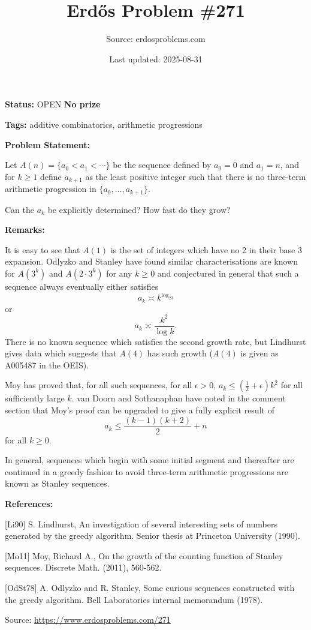 \documentclass{article}
\title{Erd\H{o}s Problem \#271}
\date{Last updated: 2025-08-31}
\author{Source: erdosproblems.com}
\begin{document}
\maketitle

\noindent\textbf{Status:} OPEN \quad \textbf{No prize}

\noindent\textbf{Tags:} additive combinatorics, arithmetic progressions

\medskip
\noindent\textbf{Problem Statement:}

Let $A(n)=\{a_0<a_1<\cdots\}$ be the sequence defined by $a_0=0$ and $a_1=n$, and for $k\geq 1$ define $a_{k+1}$ as the least positive integer such that there is no three-term arithmetic progression in $\{a_0,\ldots,a_{k+1}\}$.

Can the $a_k$ be explicitly determined? How fast do they grow?

\bigskip
\noindent\textbf{Remarks:}

It is easy to see that $A(1)$ is the set of integers which have no 2 in their base 3 expansion. Odlyzko and Stanley \cite{OdSt78} have found similar characterisations are known for $A(3^k)$ and $A(2\cdot 3^k)$ for any $k\geq 0$ and conjectured in general that such a sequence always eventually either satisfies\[a_k\asymp k^{\log_23}\]or\[a_k \asymp \frac{k^2}{\log k}.\]There is no known sequence which satisfies the second growth rate, but Lindhurst \cite{Li90} gives data which suggests that $A(4)$ has such growth ($A(4)$ is given as A005487 in the OEIS).

Moy \cite{Mo11} has proved that, for all such sequences, for all $\epsilon>0$, $a_k\leq (\frac{1}{2}+\epsilon)k^2$ for all sufficiently large $k$. van Doorn and Sothanaphan have noted in the comment section that Moy's proof can be upgraded to give a fully explicit result of\[a_k\leq \frac{(k-1)(k+2)}{2}+n\]for all $k\geq 0$.

In general, sequences which begin with some initial segment and thereafter are continued in a greedy fashion to avoid three-term arithmetic progressions are known as Stanley sequences.

\bigskip
\noindent\textbf{References:}

[Li90] S. Lindhurst, An investigation of several interesting sets of numbers generated by the greedy
algorithm. Senior thesis at Princeton University (1990).
 
 [Mo11] Moy, Richard A., On the growth of the counting function of Stanley sequences. Discrete Math. (2011), 560-562.
 
 [OdSt78] A. Odlyzko and R. Stanley, Some curious sequences constructed with the greedy algorithm. Bell Laboratories internal memorandum (1978).

\bigskip
\noindent\small{Source: \url{https://www.erdosproblems.com/271}}
\end{document}
